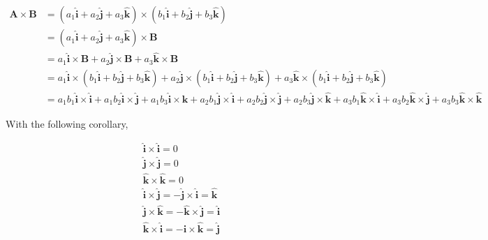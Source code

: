 \begin{align}
    \boldsymbol{A} \times \boldsymbol{B} &= (a_1\boldsymbol{\hat{i}} + a_2\boldsymbol{\hat{j}} + a_3\boldsymbol{\hat{k}}) \times (b_1\boldsymbol{\hat{i}} + b_2\boldsymbol{\hat{j}} + b_3\boldsymbol{\hat{k}}) \\
    &= (a_1\boldsymbol{\hat{i}} + a_2\boldsymbol{\hat{j}} + a_3\boldsymbol{\hat{k}}) \times \boldsymbol{B} \\
    &= a_1\boldsymbol{\hat{i}} \times \boldsymbol{B} + a_2\boldsymbol{\hat{j}} \times \boldsymbol{B} + a_3\boldsymbol{\hat{k}} \times \boldsymbol{B} \\
    &= a_1\boldsymbol{\hat{i}} \times (b_1\boldsymbol{\hat{i}} + b_2\boldsymbol{\hat{j}} + b_3\boldsymbol{\hat{k}}) + a_2\boldsymbol{\hat{j}} \times (b_1\boldsymbol{\hat{i}} + b_2\boldsymbol{\hat{j}} + b_3\boldsymbol{\hat{k}}) + a_3\boldsymbol{\hat{k}} \times (b_1\boldsymbol{\hat{i}} + b_2\boldsymbol{\hat{j}} + b_3\boldsymbol{\hat{k}}) \\
    &= a_1 b_1 \boldsymbol{\hat{i}} \times \boldsymbol{\hat{i}} + a_1 b_2 \boldsymbol{\hat{i}} \times \boldsymbol{\hat{j}} + a_1 b_3 \boldsymbol{\hat{i}} \times \boldsymbol{\hat{k}} + a_2 b_1 \boldsymbol{\hat{j}} \times \boldsymbol{\hat{i}} + a_2 b_2 \boldsymbol{\hat{j}} \times \boldsymbol{\hat{j}} + a_2 b_3 \boldsymbol{\hat{j}} \times \boldsymbol{\hat{k}} + a_3 b_1 \boldsymbol{\hat{k}} \times \boldsymbol{\hat{i}} + a_3 b_2 \boldsymbol{\hat{k}} \times \boldsymbol{\hat{j}} + a_3 b_3 \boldsymbol{\hat{k}} \times \boldsymbol{\hat{k}}\label{eq:cross-product-complete-expand}
\end{align}

With the following corollary,

\begin{align}
    \boldsymbol{\hat{i}} \times \boldsymbol{\hat{i}} = 0 \\
    \boldsymbol{\hat{j}} \times \boldsymbol{\hat{j}} = 0 \\
    \boldsymbol{\hat{k}} \times \boldsymbol{\hat{k}} = 0 \\
    \boldsymbol{\hat{i}} \times \boldsymbol{\hat{j}} = -\boldsymbol{\hat{j}} \times \boldsymbol{\hat{i}} = \boldsymbol{\hat{k}} \\
    \boldsymbol{\hat{j}} \times \boldsymbol{\hat{k}} = -\boldsymbol{\hat{k}} \times \boldsymbol{\hat{j}} = \boldsymbol{\hat{i}} \\
    \boldsymbol{\hat{k}} \times \boldsymbol{\hat{i}} = -\boldsymbol{\hat{i}} \times \boldsymbol{\hat{k}} = \boldsymbol{\hat{j}} \\
\end{align}

